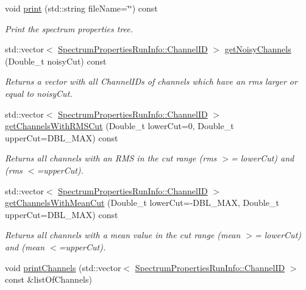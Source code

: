 \begin{DoxyCompactItemize}
void \hyperlink{class_spectrum_properties_run_info_a585bf973ed2708d8095ad7510cb67724}{print} (std::string fileName=\char`\"{}\char`\"{}) const 
\begin{DoxyCompactList}\small\item\em Print the spectrum properties tree. \item\end{DoxyCompactList}\item 
std::vector$<$ \hyperlink{class_spectrum_properties_run_info_1_1_channel_i_d}{SpectrumPropertiesRunInfo::ChannelID} $>$ \hyperlink{class_spectrum_properties_run_info_a224a09a5da8dd40b3b368ce11811a816}{getNoisyChannels} (Double\_\-t noisyCut) const 
\begin{DoxyCompactList}\small\item\em Returns a vector with all ChannelIDs of channels which have an rms larger or equal to {\ttfamily noisyCut}. \item\end{DoxyCompactList}\item 
std::vector$<$ \hyperlink{class_spectrum_properties_run_info_1_1_channel_i_d}{SpectrumPropertiesRunInfo::ChannelID} $>$ \hyperlink{class_spectrum_properties_run_info_aa2d88f63b3ea5d414bbe98708689a706}{getChannelsWithRMSCut} (Double\_\-t lowerCut=0, Double\_\-t upperCut=DBL\_\-MAX) const 
\begin{DoxyCompactList}\small\item\em Returns all channels with an RMS in the cut range (rms $>$= lowerCut) and (rms $<$=upperCut). \item\end{DoxyCompactList}\item 
std::vector$<$ \hyperlink{class_spectrum_properties_run_info_1_1_channel_i_d}{SpectrumPropertiesRunInfo::ChannelID} $>$ \hyperlink{class_spectrum_properties_run_info_a29a7ddfe9965e36250ea137b9b981496}{getChannelsWithMeanCut} (Double\_\-t lowerCut=-\/DBL\_\-MAX, Double\_\-t upperCut=DBL\_\-MAX) const 
\begin{DoxyCompactList}\small\item\em Returns all channels with a mean value in the cut range (mean $>$= lowerCut) and (mean $<$=upperCut). \item\end{DoxyCompactList}\item 
void \hyperlink{class_spectrum_properties_run_info_aae84c9751a720ce8ec1fa702b54713d1}{printChannels} (std::vector$<$ \hyperlink{class_spectrum_properties_run_info_1_1_channel_i_d}{SpectrumPropertiesRunInfo::ChannelID} $>$ const \&listOfChannels)

\end{DoxyCompactItemize}
